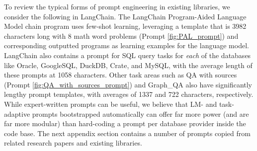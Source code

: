 To review the typical forms of prompt engineering in existing libraries, we consider the following in LangChain. The LangChain Program-Aided Language Model \citet{gao2023rarr} chain program uses few-shot learning, leveraging a template that is 3982 characters long with 8 math word problems ({Prompt \ref{fig:PAL_prompt}}) and corresponding outputted programs as learning examples for the language model. LangChain also contains a prompt for SQL query tasks for \textit{each} of the databases like Oracle, GoogleSQL, DuckDB, Crate, and MySQL, with the average length of these prompts at 1058 characters. Other task areas such as QA with sources ({Prompt \ref{fig:QA_with_sources_prompt}}) and Graph\_QA also have significantly lengthy prompt templates, with averages of 1337 and 722 characters, respectively. While expert-written prompts can be useful, we believe that LM- and task-adaptive prompts bootstrapped automatically can offer far more power (and are far more modular) than hard-coding a prompt per database provider inside the code base. The next appendix section contains a number of prompts copied from related research papers and existing libraries.





